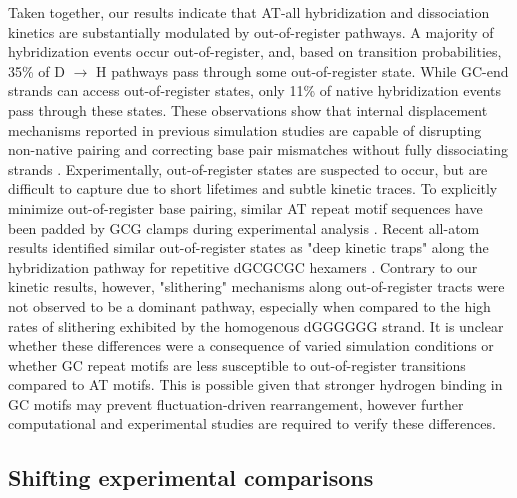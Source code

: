 \documentclass[journal=jpcbfk,manuscript=article]{achemso}
\begin{document}
Taken together, our results indicate that AT-all hybridization and dissociation kinetics are substantially modulated by out-of-register pathways. A majority of hybridization events occur out-of-register, and, based on transition probabilities, 35\% of D $\rightarrow$ H pathways pass through some out-of-register state. While GC-end strands can access out-of-register states, only 11\% of native hybridization events pass through these states. These observations show that internal displacement mechanisms reported in previous simulation studies are capable of disrupting non-native pairing and correcting base pair mismatches without fully dissociating strands \citep{Romano2013DNADependence, Markegard2015, Maciejczyk2014DNAModel}. Experimentally, out-of-register states are suspected to occur, but are difficult to capture due to short lifetimes and subtle kinetic traces. To explicitly minimize out-of-register base pairing, similar AT repeat motif sequences have been padded by GCG clamps during experimental analysis \cite{Wyer2014KineticsAT-tracts}. Recent all-atom results identified similar out-of-register states as "deep kinetic traps" along the hybridization pathway for repetitive dGCGCGC hexamers \citep{Xiao2019}. Contrary to our kinetic results, however, "slithering" mechanisms along out-of-register tracts were not observed to be a dominant pathway, especially when compared to the high rates of slithering exhibited by the homogenous dGGGGGG strand. It is unclear whether these differences were a consequence of varied simulation conditions or whether GC repeat motifs are less susceptible to out-of-register transitions compared to AT motifs. This is possible given that stronger hydrogen binding in GC motifs may prevent fluctuation-driven rearrangement, however further computational and experimental studies are required to verify these differences.

\subsection{Shifting experimental comparisons}
\end{document}
